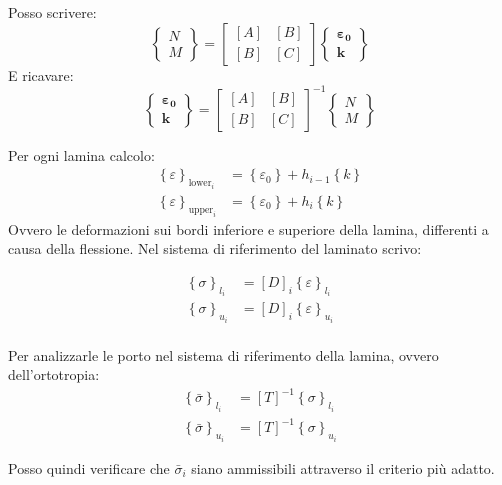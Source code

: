 Posso scrivere:
\begin{equation*}
\left\{
\begin{array}{c}
N\\M
\end{array}
\right\}
=
\begin{bmatrix}
[A] & [B] \\
[B] & [C]
\end{bmatrix}
\left\{
\begin{array}{c}
\boldsymbol{\varepsilon_0}\\
\boldsymbol{k}
\end{array}
\right\}
\end{equation*}
E ricavare:
\begin{equation*}
\left\{
\begin{array}{c}
\boldsymbol{\varepsilon_0}\\
\boldsymbol{k}
\end{array}
\right\}= \begin{bmatrix}
[A] & [B] \\
[B] & [C]
\end{bmatrix}^{-1}
\left\{
\begin{array}{c}
N\\M
\end{array}
\right\}
\end{equation*}


Per ogni lamina calcolo:
\begin{align*}
     \left\{\varepsilon\right\}_{\text{lower}_i} &=    \left\{\varepsilon_0\right\}+     h_{i-1}  \left\{k\right\}\\
       \left\{\varepsilon\right\}_{\text{upper}_i} &=    \left\{\varepsilon_0\right\}+     h_{i}  \left\{k\right\}
\end{align*}
Ovvero le deformazioni sui bordi inferiore e superiore della lamina, differenti a causa della flessione. Nel sistema di riferimento del laminato scrivo:

\begin{align*}
     \left\{\sigma\right\}_{l_i} &= [D]_i \left\{\varepsilon\right\}_{l_i}\\
     \left\{\sigma\right\}_{u_i} &= [D]_i \left\{\varepsilon\right\}_{u_i}\\
\end{align*}

Per analizzarle le porto nel sistema di riferimento della lamina, ovvero dell'ortotropia:
\begin{align*}
     \left\{\bar{\sigma}\right\}_{l_i} &= [T]^{-1}  \left\{\sigma\right\}_{l_i}\\
     \left\{\bar{\sigma}\right\}_{u_i} &= [T]^{-1}   \left\{\sigma\right\}_{u_i}
\end{align*}

Posso quindi verificare che $\bar{\sigma}_i$ siano ammissibili attraverso il criterio più adatto.
